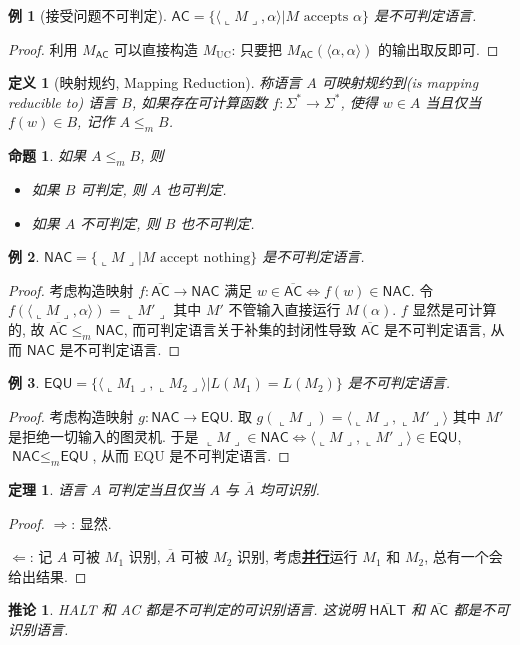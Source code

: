 \documentclass[8pt]{article}
\theoremstyle{compact}
\newtheorem{theorem}{定理}
\newtheorem{definition}{定义}
\newtheorem{proposition}{命题}
\newtheorem{corollary}{推论}
\newtheorem{example}{例}
\def\obj#1{\textbf{\uline{#1}}}
\def\le{\leqslant}
\def\rep#1{\llcorner{#1}\lrcorner}
\begin{document}
\begin{example}[接受问题不可判定]
	$\textsf{AC} = \{\langle \rep M, \alpha \rangle | M \text{ accepts } \alpha\}$ 是不可判定语言.	
\end{example}
\begin{proof}
	利用 $M_{\textsf{AC}}$ 可以直接构造 $M_{\text{UC}}$: 只要把 $M_{\textsf{AC}}(\langle \alpha, \alpha \rangle)$ 的输出取反即可.
\end{proof}
\begin{definition}[映射规约, Mapping Reduction]
	称语言 $A$ 可映射规约到(is mapping reducible to) 语言 $B$, 如果存在可计算函数 $f: \Sigma^* \to \Sigma^*$, 使得 $w \in A$ 当且仅当 $f(w) \in B$, 记作 $A \le_m B$.
\end{definition}
\begin{proposition} 如果 $A \le_m B$, 则
	\begin{itemize}
		\item 如果 $B$ 可判定, 则 $A$ 也可判定.
		\item 如果 $A$ 不可判定, 则 $B$ 也不可判定.
	\end{itemize}
\end{proposition}
\begin{example}
	$\textsf{NAC} = \{\rep M | M \text{ accept nothing}\}$ 是不可判定语言.
\end{example}
\begin{proof}
	考虑构造映射 $f: \overline{\textsf{AC}} \to \textsf{NAC}$ 满足 $w \in \overline{\textsf{AC}} \Leftrightarrow f(w) \in \textsf{NAC}$. 令 $f(\langle \rep M, \alpha \rangle) = \rep{M'}$ 其中 $M'$ 不管输入直接运行 $M(\alpha)$. $f$ 显然是可计算的, 故 $\overline{\textsf{AC}} \le_m \textsf{NAC}$, 而可判定语言关于补集的封闭性导致 $\overline{\textsf{AC}}$ 是不可判定语言, 从而 $\textsf{NAC}$ 是不可判定语言.
\end{proof}
\begin{example}
	$\textsf{EQU} = \{\langle \rep{M_1}, \rep{M_2} \rangle | L(M_1) = L(M_2)\}$ 是不可判定语言.
\end{example}
\begin{proof}
	考虑构造映射 $g: \textsf{NAC} \to \textsf{EQU}$. 取 $g(\rep{M}) = \langle \rep{M}, \rep{M'}\rangle$ 其中 $M'$ 是拒绝一切输入的图灵机. 于是 $\rep{M} \in \textsf{NAC} \Leftrightarrow \langle \rep{M}, \rep{M'}\rangle \in \textsf{EQU}$, $\textsf{NAC} \le_m \textsf{EQU}$, 从而 \textsf{EQU} 是不可判定语言.
\end{proof}
\begin{theorem}
	语言 $A$ 可判定当且仅当 $A$ 与 $\overline{A}$ 均可识别.
\end{theorem}
\begin{proof}
	$\Rightarrow$: 显然.

	$\Leftarrow$: 记 $A$ 可被 $M_1$ 识别, $\overline A$ 可被 $M_2$ 识别, 考虑\obj{并行}运行 $M_1$ 和 $M_2$, 总有一个会给出结果. 
\end{proof}
\begin{corollary}
	\textsf{HALT} 和 \textsf{AC} 都是不可判定的可识别语言. 这说明 $\overline{\textsf{HALT}}$ 和 $\overline{\textsf{AC}}$ 都是不可识别语言.
\end{corollary}
\end{document}
